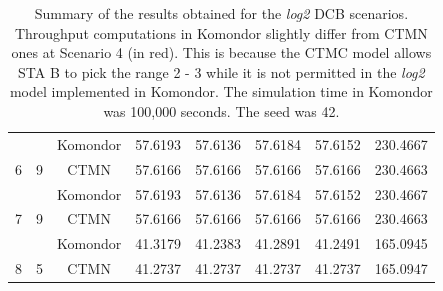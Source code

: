 \documentclass[a4paper]{article}
\begin{document}
\begin{table}[]
\begin{tabular}{|c|c|c|c|c|c|c|c|}
			                                            &                                              & Komondor       & 57.6193    & 57.6136    & 57.6184    & 57.6152    & 230.4667   \\ \cline{3-8} 
			\multirow{-2}{*}{6}                         & \multirow{-2}{*}{9}                          & CTMN          & 57.6166    & 57.6166    & 57.6166    & 57.6166    & 230.4663   \\ \hline
			                                            &                                              & Komondor       & 57.6193    & 57.6136    & 57.6184    & 57.6152    & 230.4667   \\ \cline{3-8} 
			\multirow{-2}{*}{7}                         & \multirow{-2}{*}{9}                          & CTMN          & 57.6166    & 57.6166    & 57.6166    & 57.6166    & 230.4663   \\ \hline
			                                            &                                              & Komondor       & 41.3179    & 41.2383    & 41.2891    & 41.2491    & 165.0945   \\ \cline{3-8} 
			\multirow{-2}{*}{8}                         & \multirow{-2}{*}{5}                          & CTMN          & 41.2737    & 41.2737    & 41.2737    & 41.2737    & 165.0947   \\ \hline
		\end{tabular}
		\caption{Summary of the results obtained for the \textit{log2} DCB scenarios. Throughput computations in Komondor slightly differ from CTMN ones at Scenario 4 (in red). This is because the CTMC model allows STA B to pick the range 2 - 3 while it is not permitted in the \textit{log2} model implemented in Komondor. The simulation time in Komondor was 100,000 seconds. The seed was 42.}
		\label{table:scenario_4wlans}
	\end{table}
	
\end{document}
